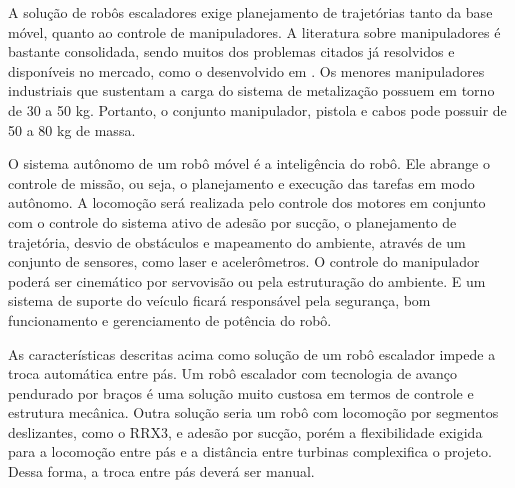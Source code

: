 A solução de robôs escaladores exige planejamento de trajetórias tanto da base
móvel, quanto ao controle de manipuladores. A literatura sobre
manipuladores é bastante consolidada, sendo muitos dos problemas citados já
resolvidos e disponíveis no mercado, como o desenvolvido em
\cite{manzdevelopment}. Os menores manipuladores industriais que sustentam a
carga do sistema de metalização possuem em torno de 30 a 50 kg. Portanto, o
conjunto manipulador, pistola e cabos pode possuir de 50 a 80 kg de massa.


O sistema autônomo de um robô móvel é a inteligência do robô. Ele abrange o
controle de missão, ou seja, o planejamento e execução das tarefas em modo
autônomo. A locomoção será realizada pelo controle dos motores em conjunto com o
controle do sistema ativo de adesão por sucção, o planejamento de trajetória, desvio de
obstáculos e mapeamento do ambiente, através de um conjunto de sensores, como
laser e acelerômetros. O controle do manipulador poderá ser cinemático por
servovisão ou pela estruturação do ambiente. E um sistema de suporte do veículo
ficará responsável pela segurança, bom funcionamento e gerenciamento de potência
do robô.

As características descritas acima como solução de um robô escalador impede a
troca automática entre pás. Um robô escalador com tecnologia de avanço pendurado
por braços é uma solução muito custosa em termos de controle e estrutura
mecânica. Outra solução seria um robô com locomoção por segmentos deslizantes,
como o RRX3, e adesão por sucção, porém a flexibilidade exigida para a locomoção
entre pás e a distância entre turbinas complexifica o projeto. Dessa forma, a
troca entre pás deverá ser manual.



